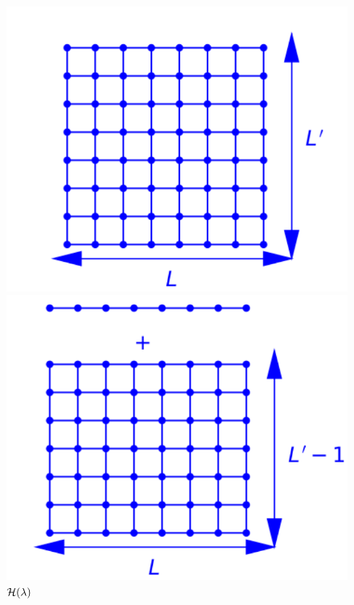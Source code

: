 \begin{figure}
	\begin{minipage}[t]{0.3\linewidth}
		\includegraphics[width=\linewidth]{numerical/cross-h0.pdf}
		\caption*{$\mH_0$}
	\end{minipage}
	\begin{minipage}[t]{0.3\linewidth}
		\includegraphics[width=\linewidth]{numerical/cross-h1.pdf}
		\caption*{$\mathcal{H}(\lambda)$}		
	\end{minipage}
	\centering
	\begin{minipage}[t]{0.3\linewidth}

\end{minipage}
\end{figure}
